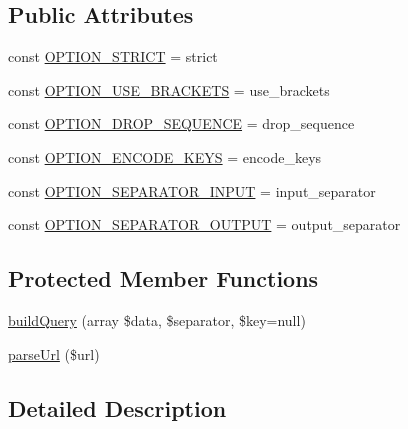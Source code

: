 \subsection*{Public Attributes}
\begin{DoxyCompactItemize}
\item 
const \hyperlink{classNet__URL2_a766955033bdccec7175d0694df62a1a9}{O\+P\+T\+I\+O\+N\+\_\+\+S\+T\+R\+I\+CT} = \textquotesingle{}strict\textquotesingle{}
\item 
const \hyperlink{classNet__URL2_a864182f067e5df22055afc3a0dfe5a57}{O\+P\+T\+I\+O\+N\+\_\+\+U\+S\+E\+\_\+\+B\+R\+A\+C\+K\+E\+TS} = \textquotesingle{}use\+\_\+brackets\textquotesingle{}
\item 
const \hyperlink{classNet__URL2_af415684f1d85246c1132203142b86499}{O\+P\+T\+I\+O\+N\+\_\+\+D\+R\+O\+P\+\_\+\+S\+E\+Q\+U\+E\+N\+CE} = \textquotesingle{}drop\+\_\+sequence\textquotesingle{}
\item 
const \hyperlink{classNet__URL2_ae06ebc991de4ffe92644c5a8d37ad5ac}{O\+P\+T\+I\+O\+N\+\_\+\+E\+N\+C\+O\+D\+E\+\_\+\+K\+E\+YS} = \textquotesingle{}encode\+\_\+keys\textquotesingle{}
\item 
const \hyperlink{classNet__URL2_af5b6f766fae9600b3938e33c32893bce}{O\+P\+T\+I\+O\+N\+\_\+\+S\+E\+P\+A\+R\+A\+T\+O\+R\+\_\+\+I\+N\+P\+UT} = \textquotesingle{}input\+\_\+separator\textquotesingle{}
\item 
const \hyperlink{classNet__URL2_a84719f522747f51638a9c8474d4abc39}{O\+P\+T\+I\+O\+N\+\_\+\+S\+E\+P\+A\+R\+A\+T\+O\+R\+\_\+\+O\+U\+T\+P\+UT} = \textquotesingle{}output\+\_\+separator\textquotesingle{}
\end{DoxyCompactItemize}
\subsection*{Protected Member Functions}
\begin{DoxyCompactItemize}
\item 
\hyperlink{classNet__URL2_a44d9ffd390931b846152080feb6a1740}{build\+Query} (array \$data, \$separator, \$key=null)
\item 
\hyperlink{classNet__URL2_a498acb2786e9f3074c6d52432de4c9d4}{parse\+Url} (\$url)
\end{DoxyCompactItemize}


\subsection{Detailed Description}


